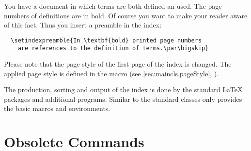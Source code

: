 \begin{Example}
  You have a document in which terms are both defined an used. The
  page numbers of definitions are in bold. Of course you want to make
  your reader aware of this fact. Thus you insert a preamble in the
  index:
\begin{lstlisting}
  \setindexpreamble{In \textbf{bold} printed page numbers
    are references to the definition of terms.\par\bigskip}
\end{lstlisting}
\end{Example}
%
Please note that the page style of the first page of the index is
changed. The applied page style is defined in the macro
(see \autoref{sec:maincls.pageStyle},
).

The production, sorting and output of the index is done by the
standard \LaTeX{} packages and additional programs. Similar to the
standard classes {\KOMAScript} only provides the basic macros and
environments.
%
%


\section{Obsolete Commands}
\label{sec:maincls.obsolete}

